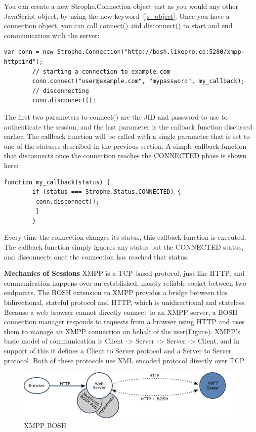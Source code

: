 	You can create a new Strophe.Connection object just as you would any other JavaScript object, by using the new keyword~\ref{js_object}.	Once you have a connection object, you can call connect() and disconnect() to start and end	communication with the server:
	    \begin{lstlisting}[label=js_object,caption=Stanzas Format]
		var conn = new Strophe.Connection("http://bosh.likepro.co:5280/xmpp-httpbind");
		// starting a connection to example.com
		conn.connect("user@example.com", "mypassword", my_callback);
		// disconnecting
		conn.disconnect();
	    \end{lstlisting}
	The first two parameters to connect() are the JID and password to use to authenticate the session,
	and the last parameter is the callback function discussed earlier. The callback function will be called
	with a single parameter that is set to one of the statuses described in the previous section. A simple
	callback function that disconnects once the connection reaches the CONNECTED phase is shown here:
	    \begin{lstlisting}[label=js_object,caption=Stanzas Format]
		function my_callback(status) {
		if (status === Strophe.Status.CONNECTED) {
		 conn.disconnect();
		 }
	    }
	    \end{lstlisting}
Every time the connection changes its status, this callback function is executed. The callback function simply ignores any status but the CONNECTED status, and disconnects once the connection
has reached that status.

\textbf{Mechanics of Sessions}
\newline
XMPP is a TCP-based protocol, just like HTTP, and communication happens over an established, mostly reliable socket between two endpoints. The BOSH extension to XMPP provides a bridge between this bidirectional, stateful protocol and HTTP, which is unidirectional and stateless. Because a web browser cannot directly connect to an XMPP server, a BOSH connection manager responds to requests from a browser using HTTP and uses them to manage an XMPP connection on behalf of the user(Figure).  XMPP's basic model of communication is Client -> Server -> Server -> Client, and in support of this it defines a Client to Server protocol and a Server to Server protocol. Both of these protocols use XML encoded protocol directly over TCP.
  \begin{figure}[!ht]
  \centering
  \includegraphics[scale=0.8]{images/xmpp-bosh.png}   
  \caption[BOSH]{XMPP BOSH}                         
  \end{figure} 

